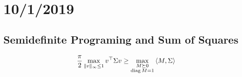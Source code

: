 \section{10/1/2019}

\subsection{Semidefinite Programing and Sum of Squares}

\begin{theorem}
    \begin{align}
        \frac{\pi}{2} \max_{\|v\|_\infty \leq 1} v^\top \Sigma v
        \geq \max_{\substack{M \succeq 0 \\ \operatorname{diag} M = 1}} \braket{M, \Sigma}
    \end{align}
\end{theorem}

